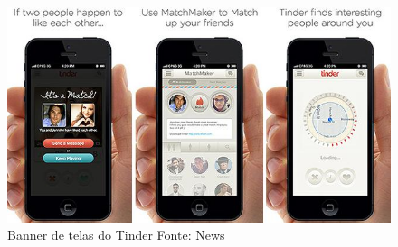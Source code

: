 \begin{figure}[t]
	\centering
	\includegraphics[scale=0.7]{imagens/tinder.jpg}
	\caption{\small Banner de telas do Tinder Fonte: News \cite{tinder-img}}
	\label{fig:tinder-img}
\end{figure}